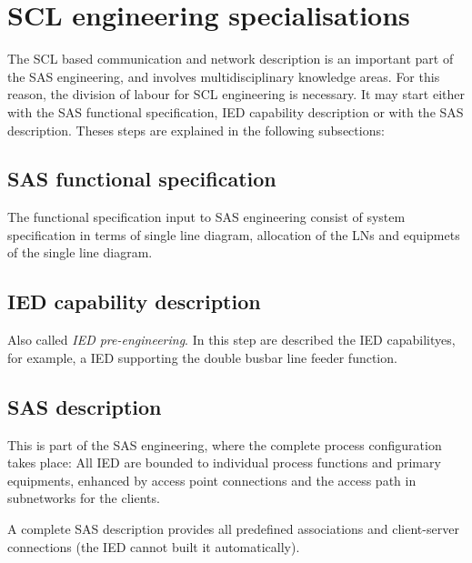 \section{SCL engineering specialisations} 
\label{sec:SCL-engineering-parts}
The SCL based communication and network description 
is an important part of the \gls{SAS} engineering, 
and involves multidisciplinary knowledge areas. 
For this reason, the division of labour 
for SCL engineering is necessary.  
It may start either with the 
SAS functional specification, 
\gls{IED} capability description
or with the \gls{SAS} description. 
Theses steps are explained 
in the following subsections: 

\subsection{SAS functional specification}
The functional specification input 
to \gls{SAS} engineering 
consist of system specification in terms of 
single line diagram, allocation of the \glspl{LN} 
and equipmets of the single line diagram.

\subsection{IED capability description}
Also called \emph{IED pre-engineering}. 
In this step are described the IED capabilityes, for 
example, a IED supporting the double busbar line feeder function.

\subsection{SAS description}
\label{sec:SAS-description-scl-engineering}
This is part of the \gls{SAS} engineering, where the 
complete process configuration takes place: All IED 
are bounded to individual process functions and primary 
equipments, enhanced by access point connections and 
the access path in subnetworks for the clients.

A complete \gls{SAS} description provides 
all predefined associations and client-server connections 
(the \gls{IED} cannot built it automatically).

